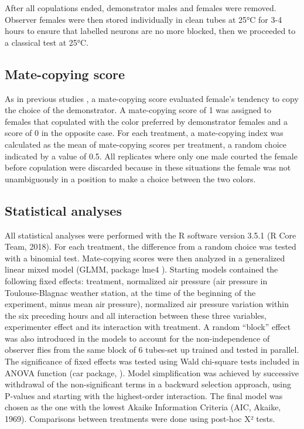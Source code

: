 \documentclass[a4paper, 12pt]{article}
\begin{document}
	After all copulations ended, demonstrator males and females were removed. Observer females were then stored individually in clean tubes at 25°C for 3-4 hours to ensure that labelled neurons are no more blocked, then we proceeded to a classical test at 25°C.


	\subsection{Mate-copying score}

	As in previous studies \parencite{danchin_cultural_2018,nobel_mate-copying_2018,monier_dopamine_2018}, a mate-copying score evaluated female’s tendency to copy the choice of the demonstrator. A mate-copying score of 1 was assigned to females that copulated with the color preferred by demonstrator females and a score of 0 in the opposite case. For each treatment, a mate-copying index was calculated as the mean of mate-copying scores per treatment, a random choice indicated by a value of 0.5. All replicates where only one male courted the female before copulation were discarded because in these situations the female was not unambiguously in a position to make a choice between the two colors.

	\subsection{Statistical analyses}

	All statistical analyses were performed with the R software version 3.5.1 (R Core Team, 2018).
	For each treatment, the difference from a random choice was tested with a binomial test. Mate-copying scores were then analyzed in a generalized linear mixed model (GLMM, package lme4 \parencite{bates_fitting_2015}). Starting models contained the following fixed effects: treatment, normalized air pressure (air pressure in Toulouse-Blagnac weather station, at the time of the beginning of the experiment, minus mean air pressure), normalized air pressure variation within the six preceding hours and all interaction between these three variables, experimenter effect and its interaction with treatment. A random “block” effect was also introduced in the models to account for the non-independence of observer flies from the same block of 6 tubes-set up trained and tested in parallel. The significance of fixed effects was tested using Wald chi-square tests included in ANOVA function (car package, \textcite{fox_r_2018} ). Model simplification was achieved by successive withdrawal of the non-significant terms in a backward selection approach, using P-values and starting with the highest-order interaction. The final model was chosen as the one with the lowest Akaike Information Criteria (AIC, Akaike, 1969). Comparisons between treatments were done using post-hoc X² tests. 
	
\end{document}

